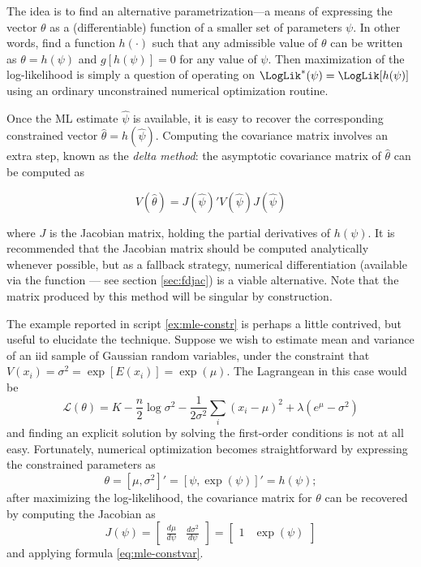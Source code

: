 The idea is to find an alternative parametrization---a means of
expressing the vector $\theta$ as a (differentiable) function of a
smaller set of parameters $\psi$. In other words, find a function
$h(\cdot)$ such that any admissible value of $\theta$ can be written
as $\theta = h(\psi)$ and $g[h(\psi)] = 0$ for any value of
$\psi$. Then maximization of the log-likelihood is simply a question
of operating on $\LogLik^*(\psi) = \LogLik[h(\psi)]$ using an ordinary
unconstrained numerical optimization routine.

Once the ML estimate $\hat{\psi}$ is available, it is easy to recover
the corresponding constrained vector $\hat{\theta} =
h(\hat{\psi})$. Computing the covariance matrix involves an extra
step, known as the \emph{delta method}: the asymptotic covariance
matrix of $\hat{\theta}$ can be computed as

\begin{equation}
  \label{eq:mle-constvar}
  V\left( \hat{\theta} \right) = J(\hat{\psi})' V\left( \hat{\psi}
  \right) J(\hat{\psi})
\end{equation}

where $J$ is the Jacobian matrix, holding the partial derivatives of
$h(\psi)$. It is recommended that the Jacobian matrix should be
computed analytically whenever possible, but as a fallback strategy,
numerical differentiation (available via the function  ---
see section \ref{sec:fdjac}) is a viable alternative. Note that the
matrix produced by this method will be singular by construction.

The example reported in script \ref{ex:mle-constr} is perhaps a little
contrived, but useful to elucidate the technique. Suppose we wish to
estimate mean and variance of an iid sample of Gaussian random
variables, under the constraint that $V(x_i) = \sigma^2 = \exp[E(x_i)]
= \exp(\mu)$. The Lagrangean in this case would be
\[
  \mathcal{L}(\theta) =
  K - \frac{n}{2} \log \sigma^2 - \frac{1}{2 \sigma^2} \sum_i (x_i -
  \mu)^2 + \lambda (e^\mu - \sigma^2)
\]
and finding an explicit solution by solving the first-order conditions
is not at all easy. Fortunately, numerical optimization becomes
straightforward by expressing the constrained parameters as
\[
  \theta = \left[ \mu, \sigma^2 \right]' = [\psi, \exp(\psi)]' =
  h(\psi) ;
\]
after maximizing the log-likelihood, the covariance matrix for
$\theta$ can be recovered by computing the Jacobian as
\[
  J(\psi) =
  \left[ \begin{array}{cc}
      \frac{d \mu}{d \psi} &
           \frac{d \sigma^2}{d \psi} 
  \end{array}\right] =          
  \left[ \begin{array}{cc}
      1 & \exp(\psi)
  \end{array}\right]           
\]
and applying formula \eqref{eq:mle-constvar}.

